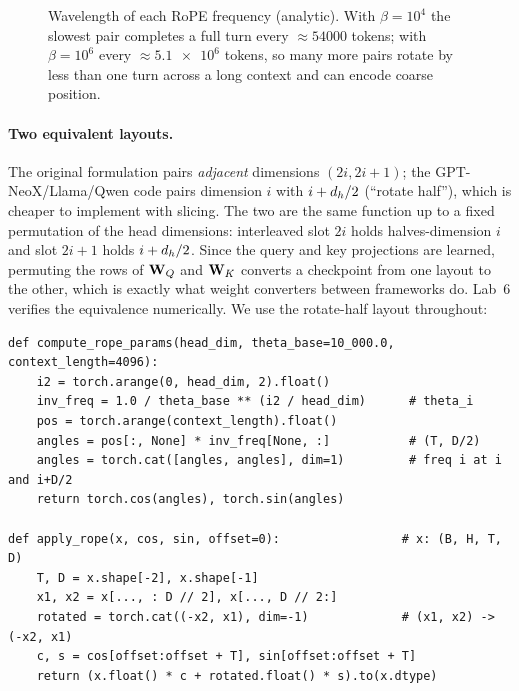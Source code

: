 \begin{figure}[t]
\centering
{}
\caption{Wavelength of each RoPE frequency (analytic). With $\beta=10^4$ the slowest pair completes
a full turn every $\approx\num{54000}$ tokens; with $\beta=10^6$ every $\approx\num{5.1e6}$ tokens, so
many more pairs rotate by less than one turn across a long context and can encode coarse position.}
\label{fig:modern:ropewave}
\end{figure}

\paragraph{Two equivalent layouts.}
The original formulation pairs \emph{adjacent} dimensions $(2i,2i+1)$; the GPT-NeoX/Llama/Qwen code
pairs dimension $i$ with $i+d_{h}/2$ (``rotate half''), which is cheaper to implement with slicing.
The two are the same function up to a fixed permutation of the head dimensions: interleaved slot $2i$
holds halves-dimension $i$ and slot $2i+1$ holds $i+d_{h}/2$. Since the query and key projections are
learned, permuting the rows of $\mathbf{W}_Q$ and $\mathbf{W}_K$ converts a checkpoint from one layout to the
other, which is exactly what weight converters between frameworks do. Lab~6 verifies the equivalence
numerically. We use the rotate-half layout throughout:

\begin{lstlisting}[caption={RoPE tables and application (rotate-half layout).},label={lst:modern:rope}]
def compute_rope_params(head_dim, theta_base=10_000.0, context_length=4096):
    i2 = torch.arange(0, head_dim, 2).float()
    inv_freq = 1.0 / theta_base ** (i2 / head_dim)      # theta_i
    pos = torch.arange(context_length).float()
    angles = pos[:, None] * inv_freq[None, :]           # (T, D/2)
    angles = torch.cat([angles, angles], dim=1)         # freq i at i and i+D/2
    return torch.cos(angles), torch.sin(angles)

def apply_rope(x, cos, sin, offset=0):                 # x: (B, H, T, D)
    T, D = x.shape[-2], x.shape[-1]
    x1, x2 = x[..., : D // 2], x[..., D // 2:]
    rotated = torch.cat((-x2, x1), dim=-1)             # (x1, x2) -> (-x2, x1)
    c, s = cos[offset:offset + T], sin[offset:offset + T]
    return (x.float() * c + rotated.float() * s).to(x.dtype)
\end{lstlisting}

